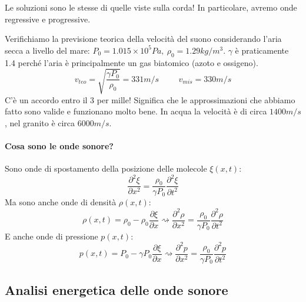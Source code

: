 Le soluzioni sono le stesse di quelle viste sulla corda! In particolare, avremo onde regressive e progressive.
\begin{eg}
	Verifichiamo la previsione teorica della velocità del suono considerando l'aria secca a livello del mare: \(P_0 = 1.015 \times 10^5 \unit{Pa},\ \rho _0 = 1.29 \unit{kg/ m^3 }\). \(\gamma \) è praticamente 1.4 perché l'aria è principalmente un gas biatomico (azoto e ossigeno).
	\begin{equation}
		v_{teo} = \sqrt{\frac{\gamma P_0}{\rho _0}} = 331 \unit{m/s} \hspace{1cm} v_{mis} = 330 \unit{m / s} 
	\end{equation}
	C'è un accordo entro il 3 per mille! Significa che le approssimazioni che abbiamo fatto sono valide e funzionano molto bene. In acqua la velocità è di circa \(1400 \unit{m / s}\), nel granito è circa \(6000 \unit{m /s}\).
\end{eg}

\paragraph{Cosa sono le onde sonore?}
Sono onde di spostamento della posizione delle molecole \(\xi (x,t)\):
\begin{equation}
	\frac{\partial^{2}  \xi }{\partial x^{2} } = \frac{\rho _0}{\gamma P_0} \frac{\partial ^{2} \xi }{\partial t ^{2} }  
\end{equation}
Ma sono anche onde di densità \(\rho (x,t)\):
\begin{equation}
	\rho (x,t) = \rho _0 - \rho _0 \frac{\partial \xi }{\partial x} \rightsquigarrow \frac{\partial ^{2} \rho }{\partial x^{2} } = \frac{\rho _0}{\gamma P_0} \frac{\partial ^{2} \rho }{\partial t ^{2} }  
\end{equation}
E anche onde di pressione \(p(x,t)\):
\begin{equation}
	p(x,t) = P_0 - \gamma P_0 \frac{\partial \xi }{\partial x} \rightsquigarrow \frac{\partial ^{2} p}{\partial x^{2} } = \frac{\rho _0}{\gamma P_0} \frac{\partial ^{2} p}{\partial t ^{2} }  
\end{equation}

\subsection{Analisi energetica delle onde sonore}

